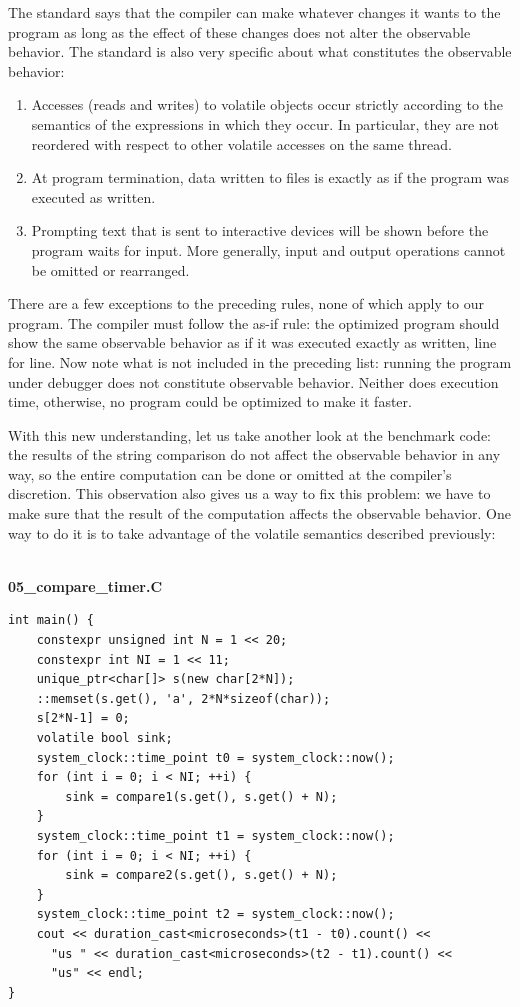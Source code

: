 The standard says that the compiler can make whatever changes it wants to the program as long as the effect of these changes does not alter the observable behavior. The standard is also very specific about what constitutes the observable behavior:

\begin{enumerate}
\item Accesses (reads and writes) to volatile objects occur strictly according to the semantics of the expressions in which they occur. In particular, they are not reordered with respect to other volatile accesses on the same thread.
\item At program termination, data written to files is exactly as if the program was executed as written.
\item Prompting text that is sent to interactive devices will be shown before the program waits for input. More generally, input and output operations cannot be omitted or rearranged.
\end{enumerate}

There are a few exceptions to the preceding rules, none of which apply to our program. The compiler must follow the as-if rule: the optimized program should show the same observable behavior as if it was executed exactly as written, line for line. Now note what is not included in the preceding list: running the program under debugger does not constitute observable behavior. Neither does execution time, otherwise, no program could be optimized to make it faster.

With this new understanding, let us take another look at the benchmark code: the results of the string comparison do not affect the observable behavior in any way, so the entire computation can be done or omitted at the compiler's discretion. This observation also gives us a way to fix this problem: we have to make sure that the result of the computation affects the observable behavior. One way to do it is to take advantage of the volatile semantics described previously:

\hspace*{\fill} \\ %
\noindent
\textbf{05\_compare\_timer.C}
\begin{lstlisting}[style=styleCXX]
int main() {
	constexpr unsigned int N = 1 << 20;
	constexpr int NI = 1 << 11;
	unique_ptr<char[]> s(new char[2*N]);
	::memset(s.get(), 'a', 2*N*sizeof(char));
	s[2*N-1] = 0;
	volatile bool sink;
	system_clock::time_point t0 = system_clock::now();
	for (int i = 0; i < NI; ++i) {
		sink = compare1(s.get(), s.get() + N);
	}
	system_clock::time_point t1 = system_clock::now();
	for (int i = 0; i < NI; ++i) {
		sink = compare2(s.get(), s.get() + N);
	}
	system_clock::time_point t2 = system_clock::now();
	cout << duration_cast<microseconds>(t1 - t0).count() <<
	  "us " << duration_cast<microseconds>(t2 - t1).count() <<
	  "us" << endl;
}
\end{lstlisting}

